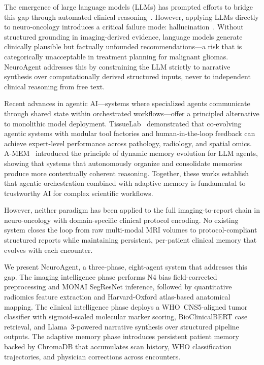 \documentclass[journal]{IEEEtran}
\begin{document}
The emergence of large language models (LLMs) has prompted efforts to
bridge this gap through automated clinical reasoning~\cite{singhal2023}.
However, applying LLMs directly to neuro-oncology introduces a critical
failure mode: hallucination~\cite{kalai2025,das2025}. Without structured
grounding in imaging-derived evidence, language models generate clinically
plausible but factually unfounded recommendations---a risk that is
categorically unacceptable in treatment planning for malignant gliomas.
NeuroAgent addresses this by constraining the LLM strictly to narrative
synthesis over computationally derived structured inputs, never to
independent clinical reasoning from free text.

Recent advances in agentic AI---systems where specialized agents
communicate through shared state within orchestrated
workflows---offer a principled alternative to monolithic model deployment.
TissueLab~\cite{tissulab2025} demonstrated that co-evolving agentic systems
with modular tool factories and human-in-the-loop feedback can achieve
expert-level performance across pathology, radiology, and spatial omics.
A-MEM~\cite{amem2024} introduced the principle of dynamic memory evolution
for LLM agents, showing that systems that autonomously organize and
consolidate memories produce more contextually coherent reasoning. Together,
these works establish that agentic orchestration combined with adaptive
memory is fundamental to trustworthy AI for complex scientific workflows.

However, neither paradigm has been applied to the full imaging-to-report
chain in neuro-oncology with domain-specific clinical protocol encoding.
No existing system closes the loop from raw multi-modal MRI volumes to
protocol-compliant structured reports while maintaining persistent,
per-patient clinical memory that evolves with each encounter.

We present NeuroAgent, a three-phase, eight-agent system that addresses
this gap. The imaging intelligence phase performs N4 bias field-corrected
preprocessing and MONAI SegResNet inference, followed by quantitative
radiomics feature extraction and Harvard-Oxford atlas-based anatomical
mapping. The clinical intelligence phase deploys a WHO~CNS5-aligned tumor
classifier with sigmoid-scaled molecular marker scoring, BioClinicalBERT
case retrieval, and Llama~3-powered narrative synthesis over structured
pipeline outputs. The adaptive memory phase introduces persistent patient
memory backed by ChromaDB that accumulates scan history, WHO classification
trajectories, and physician corrections across encounters.
\end{document}

